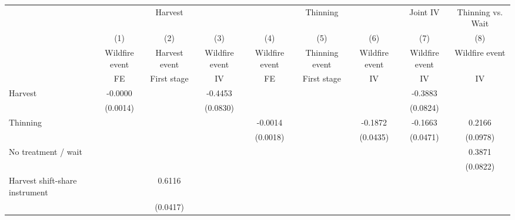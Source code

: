 \begin{tabular}{lcccccccc}
\toprule
& \multicolumn{3}{c}{Harvest} & \multicolumn{3}{c}{Thinning} & \multicolumn{1}{c}{Joint IV} & \multicolumn{1}{c}{Thinning vs. Wait} \\
\cmidrule(lr){2-4}\cmidrule(lr){5-7}\cmidrule(lr){8-8}\cmidrule(lr){9-9}
& (1) & (2) & (3) & (4) & (5) & (6) & (7) & (8) \\
& \multicolumn{1}{c}{Wildfire event} & \multicolumn{1}{c}{Harvest event} & \multicolumn{1}{c}{Wildfire event} & \multicolumn{1}{c}{Wildfire event} & \multicolumn{1}{c}{Thinning event} & \multicolumn{1}{c}{Wildfire event} & \multicolumn{1}{c}{Wildfire event} & \multicolumn{1}{c}{Wildfire event} \\
& FE & First stage & IV & FE & First stage & IV & IV & IV \\
\midrule
Harvest             &     -0.0000         &                     &     -0.4453\sym{***}&                     &                     &                     &     -0.3883\sym{***}&                     \\
                    &    (0.0014)         &                     &    (0.0830)         &                     &                     &                     &    (0.0824)         &                     \\
\addlinespace
Thinning            &                     &                     &                     &     -0.0014         &                     &     -0.1872\sym{***}&     -0.1663\sym{***}&      0.2166\sym{**} \\
                    &                     &                     &                     &    (0.0018)         &                     &    (0.0435)         &    (0.0471)         &    (0.0978)         \\
\addlinespace
No treatment / wait &                     &                     &                     &                     &                     &                     &                     &      0.3871\sym{***}\\
                    &                     &                     &                     &                     &                     &                     &                     &    (0.0822)         \\
\addlinespace
Harvest shift-share instrument&                     &      0.6116\sym{***}&                     &                     &                     &                     &                     &                     \\
                    &                     &    (0.0417)         &                     &                     &                     &                     &                     &                     \\

\end{tabular}
